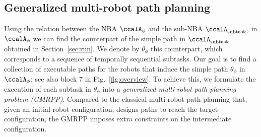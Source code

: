 \documentclass[Afour,sageh,times]{sagej}
\newtheorem{exmp}{Example}
\newcommand{\auto}[1]{\ccalA_{\textup{#1}}}
\newcommand{\autop}{\ccalA_{\phi}}
\newcommand{\vertex}[1]{v_{\textup{#1}}}
\newenvironment{cexmp}
{\addtocounter{exmp}{-1}\begin{exmp}}
  {\end{exmp}}
\begin{document}
{ %

 {\subsection{Generalized multi-robot path planning}\label{sec:mapp}
   Using  the relation between the NBA  $\autop$ and the  sub-NBA $\auto{subtask}^-$, in $\autop$ we can find the counterpart  of the  simple path in $\auto{subtask}^-$ obtained in Section~\ref{sec:run}. We denote by $\theta_{\phi}$ this counterpart, which corresponds to  a sequence of temporally sequential subtasks. Our goal is to find a collection of executable paths for the robots that induce the simple path $\theta_{\phi}$ in $\autop$; see also block 7 in Fig.~\ref{fig:overview}. To achieve this, we formulate  the execution of each subtask in $\theta_{\phi}$ into a {\it generalized multi-robot path planning problem (GMRPP)}. Compared to the classical multi-robot path planning that, given an initial robot configuration, designs paths to reach the target configuration, the GMRPP imposes extra constraints on the intermediate configuration.

}}
\end{document}
